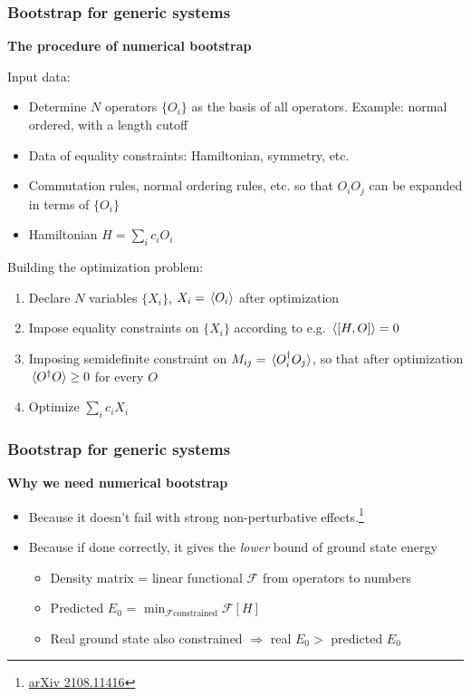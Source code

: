\documentclass{beamer}
\begin{document}
\begin{frame}
\frametitle{Bootstrap for generic systems}

\textbf{The procedure of numerical bootstrap}   

Input data:
\begin{itemize}
    \item Determine $N$ operators $\{O_i\}$ as the basis of all operators.
    Example: normal ordered, with a length cutoff 
    \item Data of equality constraints: Hamiltonian, symmetry, etc.
    \item Commutation rules, normal ordering rules, etc. so that $O_i O_j$ can be expanded in terms of $\{O_i\}$
    \item Hamiltonian $H = \sum_i c_i O_i$
\end{itemize}

Building the optimization problem:
\begin{enumerate}
    \item Declare $N$ variables $\{X_i\}$, $X_i = \expval*{O_i}$ after optimization
    \item Impose equality constraints on $\{X_i\}$ according to e.g. $\expval*{\comm{H}{O}} = 0$ 
    \item Imposing semidefinite constraint on $M_{ij} = \expval*{O_i^\dagger O_j}$, so that after optimization $\expval*{O^\dagger O} \geq 0$ for every $O$
    \item Optimize $\sum_i c_i X_i$
\end{enumerate}

\end{frame}

\begin{frame}
\frametitle{Bootstrap for generic systems}

\textbf{Why we need numerical bootstrap}

\begin{itemize}
    \item Because it doesn't fail with strong non-perturbative effects.\footnote{\href{https://arxiv.org/abs/2108.11416}{arXiv 2108.11416}}
    \item Because if done correctly, it gives the \emph{lower} bound of ground state energy
    \begin{itemize}
        \item Density matrix = linear functional $\mathcal{F}$ from operators to numbers
        \item Predicted $E_0$ = $\min_{\mathcal{F} \text{constrained}} \mathcal{F}[H]$
        \item Real ground state also constrained $\Rightarrow$ real $E_0 > $ predicted $E_0$
    \end{itemize}
\end{itemize}    

\end{frame}
\end{document}
